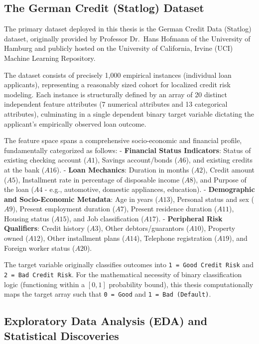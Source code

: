 \hypertarget{the-german-credit-statlog-dataset}{%
\subsection{The German Credit (Statlog)
Dataset}\label{the-german-credit-statlog-dataset}}

The primary dataset deployed in this thesis is the German Credit Data
(Statlog) dataset, originally provided by Professor Dr.~Hans Hofmann of
the University of Hamburg and publicly hosted on the University of
California, Irvine (UCI) Machine Learning Repository.

The dataset consists of precisely 1,000 empirical instances (individual
loan applicants), representing a reasonably sized cohort for localized
credit risk modeling. Each instance is structurally defined by an array
of 20 distinct independent feature attributes (7 numerical attributes
and 13 categorical attributes), culminating in a single dependent binary
target variable dictating the applicant's empirically observed loan
outcome.

The feature space spans a comprehensive socio-economic and financial
profile, fundamentally categorized as follows: - \textbf{Financial
Status Indicators}: Status of existing checking account (\(A1\)),
Savings account/bonds (\(A6\)), and existing credits at the bank
(\(A16\)). - \textbf{Loan Mechanics}: Duration in months (\(A2\)),
Credit amount (\(A5\)), Installment rate in percentage of disposable
income (\(A8\)), and Purpose of the loan (\(A4\) - e.g., automotive,
domestic appliances, education). - \textbf{Demographic and
Socio-Economic Metadata}: Age in years (\(A13\)), Personal status and
sex (\(A9\)), Present employment duration (\(A7\)), Present residence
duration (\(A11\)), Housing status (\(A15\)), and Job classification
(\(A17\)). - \textbf{Peripheral Risk Qualifiers}: Credit history
(\(A3\)), Other debtors/guarantors (\(A10\)), Property owned (\(A12\)),
Other installment plans (\(A14\)), Telephone registration (\(A19\)), and
Foreign worker status (\(A20\)).

The target variable originally classifies outcomes into
\texttt{1\ =\ Good\ Credit\ Risk} and \texttt{2\ =\ Bad\ Credit\ Risk}.
For the mathematical necessity of binary classification logic
(functioning within a \([0,1]\) probability bound), this thesis
computationally maps the target array such that \texttt{0\ =\ Good} and
\texttt{1\ =\ Bad\ (Default)}.

\hypertarget{exploratory-data-analysis-eda-and-statistical-discoveries}{%
\subsection{Exploratory Data Analysis (EDA) and Statistical
Discoveries}\label{exploratory-data-analysis-eda-and-statistical-discoveries}}

